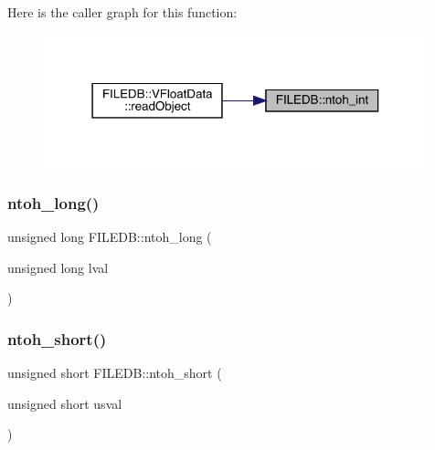 Here is the caller graph for this function\+:
\nopagebreak
\begin{figure}[H]
\begin{center}
\leavevmode
\includegraphics[width=315pt]{d2/de6/namespaceFILEDB_ab34ff6954f1b3a0dc868119d34105579_icgraph}
\end{center}
\end{figure}
\mbox{\label{namespaceFILEDB_af2fbdeeb7148fa47d1050b1ac3130897}} 
\subsubsection{\texorpdfstring{ntoh\_long()}{ntoh\_long()}}
{\footnotesize\ttfamily unsigned long F\+I\+L\+E\+D\+B\+::ntoh\+\_\+long (\begin{DoxyParamCaption}\item[{unsigned long}]{lval }\end{DoxyParamCaption})}

\mbox{\label{namespaceFILEDB_af28aef063f95fcb331d3844f6807daf5}} 
\subsubsection{\texorpdfstring{ntoh\_short()}{ntoh\_short()}}
{\footnotesize\ttfamily unsigned short F\+I\+L\+E\+D\+B\+::ntoh\+\_\+short (\begin{DoxyParamCaption}\item[{unsigned short}]{usval }\end{DoxyParamCaption})}

